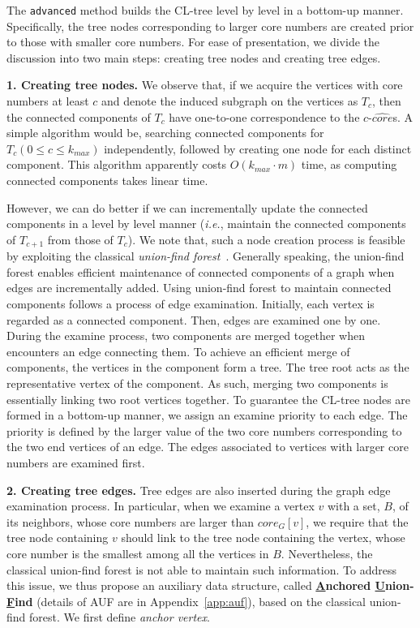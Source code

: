 The {\tt advanced} method builds the CL-tree level by level in a bottom-up manner. Specifically, the tree nodes corresponding to larger core numbers are created prior to those with smaller core numbers. For ease of presentation, we divide the discussion into two main steps: creating tree nodes and creating tree edges.

\textbf{1. Creating tree nodes.} We observe that, if we acquire the vertices with core numbers at least $c$ and denote the induced subgraph on the vertices as $T_c$, then the connected components of $T_c$ have one-to-one correspondence to the $c$-$\widehat {core}$s. A simple algorithm would be, searching connected components for $T_c (0\leq c\leq k_{max})$ independently, followed by creating one node for each distinct component. This algorithm apparently costs $O(k_{max}\cdot m)$ time, as computing connected components takes linear time.

However, we can do better if we can incrementally update the connected components in a level by level manner (\textit{i.e.}, maintain the connected components of $T_{c+1}$ from those of $T_{c}$). We note that, such a node creation process is feasible by exploiting the classical \emph{union-find forest}~\cite{unionFind}. Generally speaking, the union-find forest enables efficient maintenance of connected components of a graph when edges are incrementally added. Using union-find forest to maintain connected components follows a process of edge examination. Initially, each vertex is regarded as a connected component. Then, edges are examined one by one. During the examine process, two components are merged together when encounters an edge connecting them. To achieve an efficient merge of components, the vertices in the component form a tree. The tree root acts as the representative vertex of the component. As such, merging two components is essentially linking two root vertices together. To guarantee the CL-tree nodes are formed in a bottom-up manner, we assign an examine priority to each edge. The priority is defined by the larger value of the two core numbers corresponding to the two end vertices of an edge. The edges associated to vertices with larger core numbers are examined first.

\textbf{2. Creating tree edges.} Tree edges are also inserted during the graph edge examination process.
In particular, when we examine a vertex $v$ with a set, $B$, of its neighbors, whose core numbers are larger than $core_G[v]$,
we require that the tree node containing $v$ should link to the tree node containing
the vertex, whose core number is the smallest among all the vertices in $B$.
Nevertheless, the classical union-find forest is not able to maintain such information. To address this issue, we thus propose an auxiliary data structure,
called \textbf{\underline{A}nchored \underline{U}nion-\underline{F}ind} (details of AUF are in Appendix~\ref{app:auf}),
based on the classical union-find forest.
We first define \emph{anchor vertex}.


